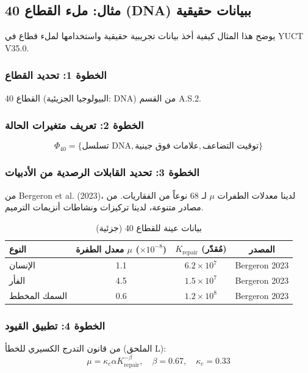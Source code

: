 \documentclass[13pt,a4paper]{article}
\begin{document}
	\subsection*{مثال: ملء القطاع 40 (DNA) ببيانات حقيقية}
	
	يوضح هذا المثال كيفية أخذ بيانات تجريبية حقيقية واستخدامها لملء قطاع في YUCT V35.0.
	
	\subsubsection*{الخطوة 1: تحديد القطاع}
	القطاع 40 (البيولوجيا الجزيئية: DNA) من القسم A.S.2.
	
	\subsubsection*{الخطوة 2: تعريف متغيرات الحالة}
	\[
	\Phi_{40} = \{ \text{تسلسل DNA}, \text{علامات فوق جينية}, \text{توقيت التضاعف} \}
	\]
	
	\subsubsection*{الخطوة 3: تحديد القابلات الرصدية من الأدبيات}
	من Bergeron et al. (2023)، لدينا معدلات الطفرات $\mu$ لـ 68 نوعاً من الفقاريات. من مصادر متنوعة، لدينا تركيزات ونشاطات أنزيمات الترميم.
	
	\begin{table}[htbp]
		\centering
		\caption{بيانات عينة للقطاع 40 (جزئية)}
		\begin{tabular}{lccc}
			\toprule
			\textbf{النوع} & \textbf{معدل الطفرة $\mu$ ($\times 10^{-8}$)} & \textbf{$K_{\mathrm{repair}}$ (مُقدّر)} & \textbf{المصدر} \\
			\midrule
			الإنسان & 1.1 & $6.2 \times 10^7$ & Bergeron 2023 \\
			الفأر & 4.5 & $1.5 \times 10^7$ & Bergeron 2023 \\
			السمك المخطط & 0.6 & $1.2 \times 10^8$ & Bergeron 2023 \\
			\bottomrule
		\end{tabular}
	\end{table}
	
	\subsubsection*{الخطوة 4: تطبيق القيود}
	من قانون التدرج الكسيري للخطأ (الملحق L):
	\[
	\mu = \kappa_c \alpha K_{\mathrm{repair}}^{-\beta}, \quad \beta = 0.67, \quad \kappa_c = 0.33
	\]
	
\end{document}
